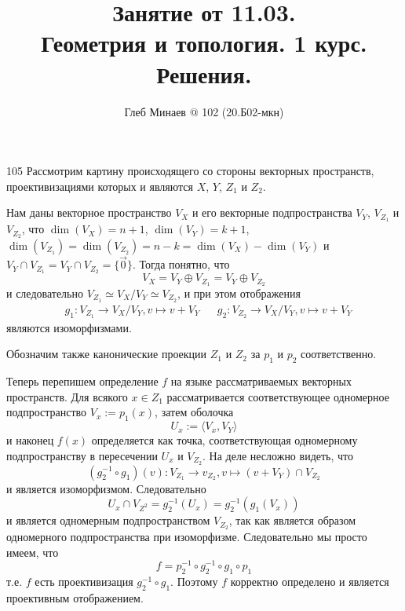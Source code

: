 \documentclass[12pt,a4paper]{article}
\title{Занятие от 11.03.\\Геометрия и топология. 1 курс.\\Решения.}
\author{Глеб Минаев @ 102 (20.Б02-мкн)}
\begin{document}
    \maketitle

    \begin{problem}{105}
        Рассмотрим картину происходящего со стороны векторных пространств, проективизациями которых и являются $X$, $Y$, $Z_1$ и $Z_2$.
        
        Нам даны векторное пространство $V_X$ и его векторные подпространства $V_Y$, $V_{Z_1}$ и $V_{Z_2}$, что $\dim(V_X) = n+1$, $\dim(V_Y) = k + 1$, $\dim(V_{Z_1}) = \dim(V_{Z_2}) = n - k = \dim(V_X) - \dim(V_Y)$ и $V_Y \cap V_{Z_1} = V_Y \cap V_{Z_2} = \{\overrightarrow{0}\}$. Тогда понятно, что
        \[V_X = V_Y \oplus V_{Z_1} = V_Y \oplus V_{Z_2}\]
        и следовательно $V_{Z_1} \simeq V_X / V_Y \simeq V_{Z_2}$, и при этом отображения
        \begin{align*}
            &g_1: V_{Z_1} \to V_X / V_Y, v \mapsto v + V_Y&
            &g_2: V_{Z_2} \to V_X / V_Y, v \mapsto v + V_Y
        \end{align*}
        являются изоморфизмами.

        Обозначим также канонические проекции $Z_1$ и $Z_2$ за $p_1$ и $p_2$ соответственно.

        Теперь перепишем определение $f$ на языке рассматриваемых векторных пространств. Для всякого $x \in Z_1$ рассматривается соответствующее одномерное подпространство $V_x := p_1(x)$, затем оболочка
        \[U_x := \langle V_x, V_Y \rangle\]
        и наконец $f(x)$ определяется как точка, соответствующая одномерному подпространству в пересечении $U_x$ и $V_{Z_2}$. На деле несложно видеть, что
        \[(g_2^{-1} \circ g_1)(v): V_{Z_1} \to v_{Z_2}, v \mapsto (v + V_Y) \cap V_{Z_2}\]
        и является изоморфизмом. Следовательно
        \[U_x \cap V_{Z^2} = g_2^{-1}(U_x) = g_2^{-1}(g_1(V_x))\]
        и является одномерным подпространством $V_{Z_2}$, так как является образом одномерного подпространства при изоморфизме. Следовательно мы просто имеем, что
        \[f = p_2^{-1} \circ g_2^{-1} \circ g_1 \circ p_1\]
        т.е. $f$ есть проективизация $g_2^{-1} \circ g_1$. Поэтому $f$ корректно определено и является проективным отображением.
    \end{problem}
\end{document}

